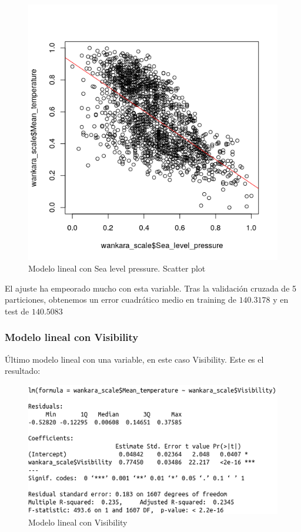 \begin{figure}[H] %
	\centering
	\includegraphics[scale=0.55]{plot4.png}  %
	\caption{Modelo lineal con Sea level pressure. Scatter plot} 
	\label{fig:plot4}
\end{figure}

El ajuste ha empeorado mucho con esta variable. Tras la validación cruzada de 5 particiones, obtenemos un error cuadrático medio en training de $140.3178$ y en test de $140.5083$

\subsubsection{Modelo lineal con Visibility}

Último modelo lineal con una variable, en este caso Visibility. Este es el resultado:

\begin{figure}[H] %
	\centering
	\includegraphics[scale=0.55]{lm5.png}  %
	\caption{Modelo lineal con Visibility} 
	\label{fig:lm5}
\end{figure}

